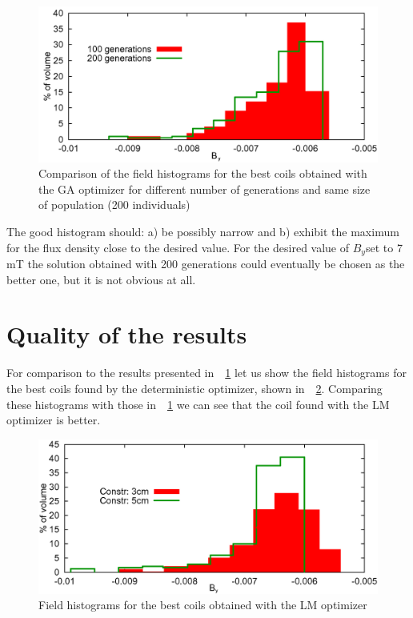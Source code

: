 \documentclass[twocolumn,a4paper]{article}
\def\rref#1{\figurename~\ref{#1}}
\begin{document}
\begin{figure}[bth]
\begin{center}
 \includegraphics[width=0.99999\linewidth]{img/hisGA200i.png}
 \caption{Comparison of the field histograms for the best coils obtained with the GA optimizer for different number of generations and same size of population (200 individuals)}
 \label{fig11}
 \end{center}
\end{figure}

The good histogram should: a) be possibly narrow and b) exhibit the maximum for the flux density close to the desired value. For the desired value of $B_y$set to 7 mT the solution obtained with 200 generations could eventually be chosen as the better one, but it is not obvious at all.

\balance

\section{Quality of the results}
For comparison to the results presented in~\rref{fig11} let us show the field histograms for the best coils found by the
deterministic optimizer, shown in~\rref{fig12}. Comparing these histograms with those in~\rref{fig11} we can see that the coil found with the LM optimizer is better.

\begin{figure}[htb]
\begin{center}
\includegraphics[width=0.99999\linewidth]{img/hisLM_por.png}
 \caption{Field histograms for the best coils obtained with the LM optimizer}
 \label{fig12}
 \end{center}
\end{figure}
\end{document}
